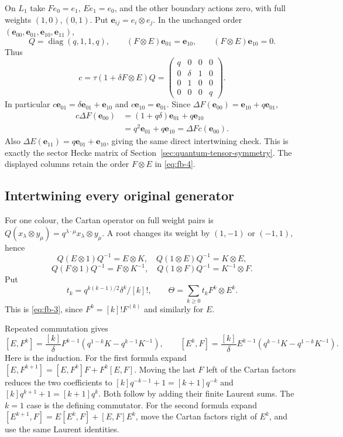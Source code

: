 On \(L_1\) take \(Fe_0=e_1\), \(Ee_1=e_0\), and the other boundary
actions zero, with full weights \((1,0),(0,1)\). Put
\(\mathbf e_{ij}=e_i\otimes e_j\). In the unchanged order
\((\mathbf e_{00},\mathbf e_{01},\mathbf e_{10},\mathbf e_{11})\),
\[
 Q=\operatorname{diag}(q,1,1,q),\qquad
 (F\otimes E)\mathbf e_{01}=\mathbf e_{10},\qquad
 (F\otimes E)\mathbf e_{10}=0.
\]
Thus
\begin{equation}\tag{FB5}\label{eq:fb-5}
 c=\tau(1+\delta F\otimes E)Q
 =\begin{pmatrix}
 q&0&0&0\\0&\delta&1&0\\0&1&0&0\\0&0&0&q
 \end{pmatrix}.
\end{equation}
In particular \(c\mathbf e_{01}=\delta\mathbf e_{01}+\mathbf e_{10}\)
and \(c\mathbf e_{10}=\mathbf e_{01}\). Since
\(\Delta F(\mathbf e_{00})=\mathbf e_{10}+q\mathbf e_{01}\),
\[
\begin{aligned}
 c\Delta F(\mathbf e_{00})
  &=(1+q\delta)\mathbf e_{01}+q\mathbf e_{10}\\
  &=q^2\mathbf e_{01}+q\mathbf e_{10}
   =\Delta F c(\mathbf e_{00}).
\end{aligned}
\]
Also \(\Delta E(\mathbf e_{11})=q\mathbf e_{01}+\mathbf e_{10}\),
giving the same direct intertwining check.
This is exactly the sector Hecke matrix of
Section~\ref{sec:quantum-tensor-symmetry}. The displayed columns retain
the order \(F\otimes E\) in \eqref{eq:fb-4}.

\subsection{Intertwining every original generator}
\label{sec:fb-intertwining}

For one colour, the Cartan operator on full weight pairs is
\(Q(x_\lambda\otimes y_\mu)=q^{\lambda\cdot\mu}x_\lambda\otimes y_\mu\).
A root changes its weight by \((1,-1)\) or \((-1,1)\), hence
\[
 Q(E\otimes1)Q^{-1}=E\otimes K,\quad
 Q(1\otimes E)Q^{-1}=K\otimes E,
\]
\begin{equation}\tag{FB6}\label{eq:fb-6}
Q(F\otimes1)Q^{-1}=F\otimes K^{-1},\quad
 Q(1\otimes F)Q^{-1}=K^{-1}\otimes F.
\end{equation}
Put
\[
 t_k=q^{k(k-1)/2}\delta^k/[k]!,\qquad
 \Theta=\sum_{k\ge0}t_k F^k\otimes E^k.
\]
This is \eqref{eq:fb-3}, since \(F^k=[k]!F^{(k)}\) and similarly for \(E\).

Repeated commutation gives
\begin{equation}\tag{FB7}\label{eq:fb-7}
[E,F^k]=\frac{[k]}{\delta}F^{k-1}
 (q^{1-k}K-q^{k-1}K^{-1}),\qquad
 [E^k,F]=\frac{[k]}{\delta}E^{k-1}
 (q^{k-1}K-q^{1-k}K^{-1}).
\end{equation}
Here is the induction. For the first formula expand
\([E,F^{k+1}]=[E,F^k]F+F^k[E,F]\). Moving the last \(F\) left of
the Cartan factors reduces the two coefficients to
\([k]q^{-k-1}+1=[k+1]q^{-k}\) and
\([k]q^{k+1}+1=[k+1]q^k\). Both follow by adding their finite Laurent
sums. The \(k=1\) case is the defining commutator. For the second formula
expand \([E^{k+1},F]=E[E^k,F]+[E,F]E^k\), move the Cartan factors right
of \(E^k\), and use the same Laurent identities.


